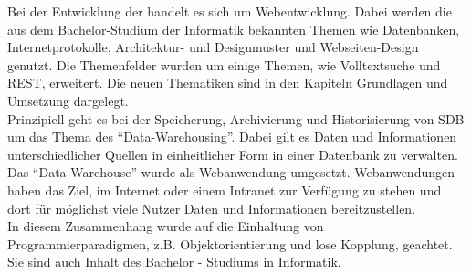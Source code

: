 Bei der Entwicklung der  handelt es sich um Webentwicklung. Dabei
werden die aus dem Bachelor-Studium der Informatik bekannten Themen wie
Datenbanken, Internetprotokolle, Architektur- und Designmuster und
Webseiten-Design genutzt. Die Themenfelder wurden um einige Themen, wie
Volltextsuche und \ac{REST}, erweitert. Die neuen Thematiken sind in den
Kapiteln Grundlagen und Umsetzung dargelegt.
\\
Prinzipiell geht es bei der Speicherung, Archivierung und Historisierung von
\ac{SDB} um das Thema des "`Data-Warehousing"'. Dabei gilt es Daten und
Informationen unterschiedlicher Quellen in einheitlicher Form in einer Datenbank
zu verwalten.
\\
Das "`Data-Warehouse"' wurde als Webanwendung umgesetzt. Webanwendungen haben
das Ziel, im Internet oder einem Intranet zur Verfügung zu stehen und dort für
möglichst viele Nutzer Daten und Informationen bereitzustellen.
\\
In diesem Zusammenhang wurde auf die Einhaltung von Programmierparadigmen,
z.B. Objektorientierung und lose Kopplung, geachtet. Sie sind auch Inhalt des
Bachelor - Studiums in Informatik.
